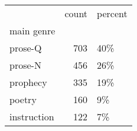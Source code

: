 \begin{table}[htbp!]
\centering
\label{table:simulgen_cp}
\begin{tabular}{lrl}
\toprule
{} &  count & percent \\
main genre  &        &         \\
\midrule
prose-Q     &    703 &     40\% \\
prose-N     &    456 &     26\% \\
prophecy    &    335 &     19\% \\
poetry      &    160 &      9\% \\
instruction &    122 &      7\% \\
\bottomrule
\end{tabular}
\end{table}
